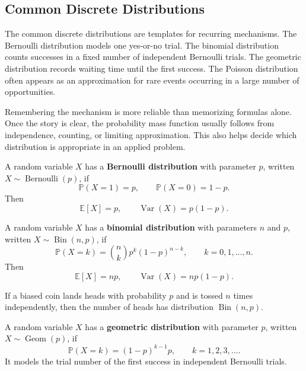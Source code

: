 \subsection{Common Discrete Distributions}


The common discrete distributions are templates for recurring mechanisms. The Bernoulli distribution models one yes-or-no trial. The binomial distribution counts successes in a fixed number of independent Bernoulli trials. The geometric distribution records waiting time until the first success. The Poisson distribution often appears as an approximation for rare events occurring in a large number of opportunities.

Remembering the mechanism is more reliable than memorizing formulas alone. Once the story is clear, the probability mass function usually follows from independence, counting, or limiting approximation. This also helps decide which distribution is appropriate in an applied problem.

\begin{definition}
A random variable $X$ has a \textbf{Bernoulli distribution} with parameter $p$, written $X\sim\operatorname{Bernoulli}(p)$, if
\[
    \mathbb{P}(X=1)=p,
    \qquad
    \mathbb{P}(X=0)=1-p.
\]
Then
\[
    \mathbb{E}[X]=p,
    \qquad
    \operatorname{Var}(X)=p(1-p).
\]
\end{definition}

\begin{definition}
A random variable $X$ has a \textbf{binomial distribution} with parameters $n$ and $p$, written $X\sim\operatorname{Bin}(n,p)$, if
\[
    \mathbb{P}(X=k)=\binom{n}{k}p^k(1-p)^{n-k},
    \qquad
    k=0,1,\dots,n.
\]
Then
\[
    \mathbb{E}[X]=np,
    \qquad
    \operatorname{Var}(X)=np(1-p).
\]
\end{definition}

\begin{example}
If a biased coin lands heads with probability $p$ and is tossed $n$ times independently, then the number of heads has distribution $\operatorname{Bin}(n,p)$.
\end{example}

\begin{definition}
A random variable $X$ has a \textbf{geometric distribution} with parameter $p$, written $X\sim\operatorname{Geom}(p)$, if
\[
    \mathbb{P}(X=k)=(1-p)^{k-1}p,
    \qquad
    k=1,2,3,\dots.
\]
It models the trial number of the first success in independent Bernoulli trials.
\end{definition}

